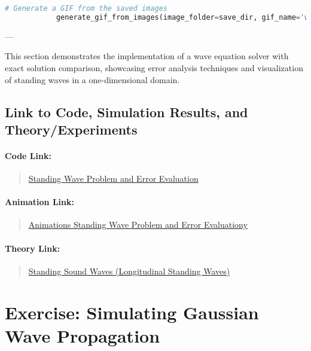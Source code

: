 \documentclass{article}
\begin{document}
		 \begin{lstlisting}[language=Python]
		 	# Generate a GIF from the saved images
		 	generate_gif_from_images(image_folder=save_dir, gif_name='wave_comparison_animation.gif', duration=0.1)
		 \end{lstlisting}
		 
		 ---
		 
		 This section demonstrates the implementation of a wave equation solver with exact solution comparison, showcasing error analysis techniques and visualization of standing waves in a one-dimensional domain.
	 
	 	 \subsection{Link to Code, Simulation Results, and Theory/Experiments}
	 	 
	 	  	 
	 	 \paragraph{Code Link:}
	 	 \begin{quote}
	 	 	\href{https://github.com/pb96git/Numerical-Solutions-for-Partial-Differential-Equations/blob/main/Part_2_WaveEquation/Example_Codes/standing_wave_error.py}{Standing Wave Problem and Error Evaluation}
	 	 \end{quote}
	 	 
	 	 \paragraph{Animation Link:}
	 	 \begin{quote}
	 	 	\href{https://github.com/pb96git/Numerical-Solutions-for-Partial-Differential-Equations/tree/main/Part_2_WaveEquation/Animations_postProcessing/standing_wave_Error}{Animations Standing Wave Problem and Error Evaluationy}
	 	 \end{quote}
	 	 
	 	 \paragraph{Theory Link:}
	 	 \begin{quote}
	 	 	\href{https://www.acs.psu.edu/drussell/Demos/StandingWaves/StandingWaves.html}{Standing Sound Waves (Longitudinal Standing Waves)}
	 	 \end{quote}
	 
	 \section{Exercise: Simulating Gaussian Wave Propagation}
	 
\end{document}
